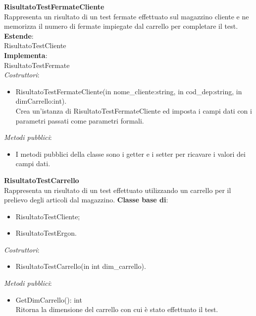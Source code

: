 \textbf{RisultatoTestFermateCliente}\\
Rappresenta un risultato di un test fermate effettuato sul magazzino cliente e ne memorizza il numero di fermate impiegate dal carrello per completare il test.\\
\textbf{Estende}:\\
RisultatoTestCliente\\
\textbf{Implementa}:\\
RisultatoTestFermate\\
\textit{Costruttori}:\\
\begin{itemize}
    \item RisultatoTestFermateCliente(in nome\_cliente:string, in cod\_dep:string, in dimCarrello:int).\\
    Crea un'istanza di RisultatoTestFermateCliente ed imposta i campi dati con i parametri passati come parametri formali.\\
\end{itemize}
\textit{Metodi pubblici}:\\
\begin{itemize}
    \item I metodi pubblici della classe sono i getter e i setter per ricavare i valori dei campi dati.\\
\end{itemize}
\textbf{RisultatoTestCarrello}\\
Rappresenta un risultato di un test effettuato utilizzando un carrello per il prelievo degli articoli dal magazzino.
\textbf{Classe base di}:
\begin{itemize}
    \item RisultatoTestCliente;
    \item RisultatoTestErgon.\\
\end{itemize}
\textit{Costruttori}:\\
\begin{itemize}
    \item RisultatoTestCarrello(in int dim\_carrello).\\
\end{itemize}
\textit{Metodi pubblici}:\\
\begin{itemize}
    \item GetDimCarrello(): int\\
    Ritorna la dimensione del carrello con cui è stato effettuato il test.\\
\end{itemize} 

